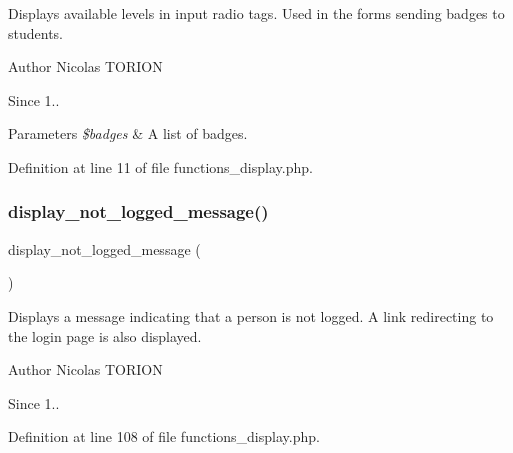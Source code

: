 Displays available levels in input radio tags. Used in the forms sending badges to students.

\begin{DoxyAuthor}{Author}
Nicolas T\+O\+R\+I\+ON 
\end{DoxyAuthor}
\begin{DoxySince}{Since}
1.. 
\end{DoxySince}

\begin{DoxyParams}{Parameters}
{\em \$badges} & A list of badges. \\
\hline
\end{DoxyParams}


Definition at line 11 of file functions\+\_\+display.\+php.

\mbox{\label{functions__display_8php_abb54a4de1df89b2139ead8d0a85716f3}} 
\subsubsection{\texorpdfstring{display\+\_\+not\+\_\+logged\+\_\+message()}{display\_not\_logged\_message()}}
{\footnotesize\ttfamily display\+\_\+not\+\_\+logged\+\_\+message (\begin{DoxyParamCaption}{ }\end{DoxyParamCaption})}

Displays a message indicating that a person is not logged. A link redirecting to the login page is also displayed.

\begin{DoxyAuthor}{Author}
Nicolas T\+O\+R\+I\+ON 
\end{DoxyAuthor}
\begin{DoxySince}{Since}
1.. 
\end{DoxySince}


Definition at line 108 of file functions\+\_\+display.\+php.

\mbox{\label{functions__display_8php_ac860f96ee2a59ae91c0ca9557238c265}} 
